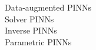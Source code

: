 \documentclass[preview]{standalone}
\begin{document}
Data-augmented PINNs\\Solver PINNs\\Inverse PINNs\\Parametric PINNs\\
\end{document}
